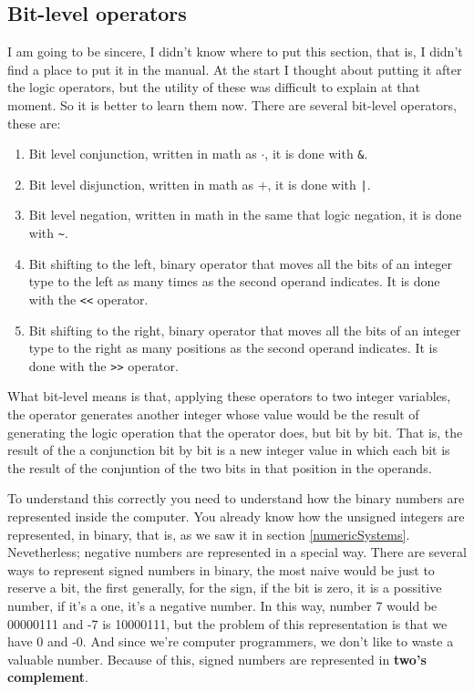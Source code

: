 \documentclass[a4paper]{article}
\begin{document}
\subsection{Bit-level operators}
I am going to be sincere, I didn't know where to put this section, that is,
I didn't find a place to put it in the manual. At the start I thought about
putting it after the logic operators, but the utility of these was difficult
to explain at that moment. So it is better to learn them now.
There are several bit-level operators, these are:
\begin{enumerate}
\item Bit level conjunction, written in math as $\cdot$, it is done with
\verb!&!.
\item Bit level disjunction, written in math as $+$, it is done with \verb!|!.
\item Bit level negation, written in math in the same that logic negation,
it is done with \verb!~!.
\item Bit shifting to the left, binary operator that moves all the bits of
an integer type to the left as many times as the second operand indicates.
It is done with the \verb!<<! operator.
\item Bit shifting to the right, binary operator that moves all the bits of
an integer type to the right as many positions as the second operand indicates.
It is done with the \verb!>>! operator.
\end{enumerate}
What bit-level means is that, applying these operators to two integer variables,
the operator generates another integer whose value would be the result of
generating the logic operation that the operator does, but bit by bit. That is,
the result of the a conjunction bit by bit is a new integer value in which each
bit is the result of the conjuntion of the two bits in that position in the
operands.

To understand this correctly you need to understand how the binary numbers are
represented inside the computer. You already know how the unsigned integers are
represented, in binary, that is, as we saw it in section \ref{numericSystems}.
Nevetherless; negative numbers are represented in a special way. There are
several ways to represent signed numbers in binary, the most naive would be just
to reserve a bit, the first generally, for the sign, if the bit is zero, it is a
possitive number, if it's a one, it's a negative number. In this way, number
7 would be 00000111 and -7 is 10000111, but the problem of this representation
is that we have 0 and -0. And since we're computer programmers, we don't like to
waste a valuable number. Because of this, signed numbers are represented in
\textbf{two's complement}.
\end{document}
